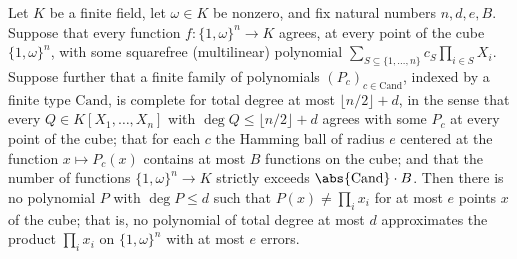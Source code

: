 \begin{theorem}
\label{RazborovSmolensky.no_low_degree_rootProd_approx_of_finite_counting}
\leanok
{}
Let $K$ be a finite field, let $\omega \in K$ be nonzero, and fix natural numbers $n, d,
e, B$. Suppose that every function $f : \{1,\omega\}^n \to K$ agrees, at every point of
the cube $\{1,\omega\}^n$, with some squarefree (multilinear) polynomial $\sum_{S
\subseteq \{1,\dots,n\}} c_S \prod_{i \in S} X_i$. Suppose further that a finite family
of polynomials $(P_c)_{c \in \mathrm{Cand}}$, indexed by a finite type $\mathrm{Cand}$,
is complete for total degree at most $\lfloor n/2 \rfloor + d$, in the sense that every
$Q \in K[X_1,\dots,X_n]$ with $\deg Q \le \lfloor n/2 \rfloor + d$ agrees with some
$P_c$ at every point of the cube; that for each $c$ the Hamming ball of radius $e$
centered at the function $x \mapsto P_c(x)$ contains at most $B$ functions on the cube;
and that the number of functions $\{1,\omega\}^n \to K$ strictly exceeds
$\abs{\mathrm{Cand}} \cdot B$. Then there is no polynomial $P$ with $\deg P \le d$ such
that $P(x) \neq \prod_{i} x_i$ for at most $e$ points $x$ of the cube; that is, no
polynomial of total degree at most $d$ approximates the product $\prod_i x_i$ on
$\{1,\omega\}^n$ with at most $e$ errors.
\end{theorem}

